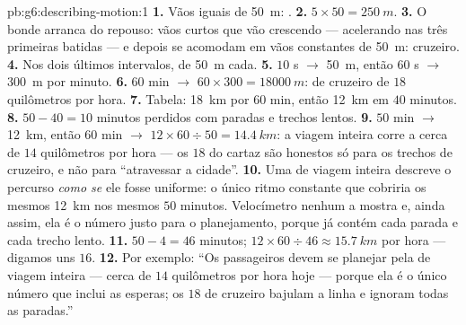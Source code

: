 \begin{solution}{pb:g6:describing-motion:1}
\textbf{1.} Vãos iguais de \qty{50}{m}: .
\textbf{2.} $5 \times 50 = \qty{250}{m}$.
\textbf{3.} O bonde arranca do repouso: vãos curtos que vão
crescendo --- acelerando nas três primeiras batidas --- e depois se
acomodam em vãos constantes de \qty{50}{m}: cruzeiro.
\textbf{4.} Nos dois últimos intervalos, de \qty{50}{m} cada.
\textbf{5.} $10$ s $\to$ \qty{50}{m}, então $60$ s $\to$
\qty{300}{m} por minuto.
\textbf{6.} $60$ min $\to$ $60 \times 300 = \qty{18000}{m}$:
 de cruzeiro de $18$ quilômetros por hora.
\textbf{7.} Tabela: \qty{18}{km} por $60$ min, então \qty{12}{km} em
$40$ minutos.
\textbf{8.} $50 - 40 = 10$ minutos perdidos com paradas e trechos
lentos.
\textbf{9.} $50$ min $\to$ \qty{12}{km}, então $60$ min $\to$
$12 \times 60 \div 50 = \qty{14.4}{km}$: a viagem inteira corre a
cerca de $14$ quilômetros por hora --- os $18$ do cartaz são honestos
só para os trechos de cruzeiro, e não para ``atravessar a cidade''.
\textbf{10.} Uma  de viagem inteira descreve o percurso
\emph{como se} ele fosse uniforme: o único ritmo constante que
cobriria os mesmos \qty{12}{km} nos mesmos $50$ minutos. Velocímetro
nenhum a mostra e, ainda assim, ela é o número justo para o
planejamento, porque já contém cada parada e cada trecho lento.
\textbf{11.} $50 - 4 = 46$ minutos;
$12 \times 60 \div 46 \approx \qty{15.7}{km}$ por hora --- digamos
uns $16$.
\textbf{12.} Por exemplo: ``Os passageiros devem se planejar pela
 de viagem inteira --- cerca de $14$ quilômetros por hora
hoje --- porque ela é o único número que inclui as esperas; os $18$
de cruzeiro bajulam a linha e ignoram todas as paradas.''
\end{solution}
